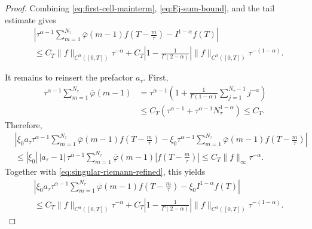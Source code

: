 \documentclass[letterpaper]{article}
\numberwithin{equation}{section}
\theoremstyle{definition}
\theoremstyle{remark}
\begin{document}
\begin{proof}
Combining \eqref{eq:first-cell-mainterm}, \eqref{eq:Ej-sum-bound}, and the tail estimate gives
\begin{equation}\label{eq:singular-riemann-refined}
\begin{aligned}
  &\left|
    \tau^{\alpha-1}\sum_{m=1}^{N_\tau}\overline\varphi(m-1)
    f\!\left(T-\frac{m}{\tau}\right)
    -
    I^{1-\alpha}f(T)
  \right|
  \\
  &\le
  C_T\|f\|_{C^{\alpha}([0,T])}\tau^{-\alpha}
  +
  C_T\left|1-\frac{1}{\Gamma(2-\alpha)}\right|
  \|f\|_{C^{\alpha}([0,T])}\tau^{-(1-\alpha)}.
\end{aligned}
\end{equation}

It remains to reinsert the prefactor $a_\tau$. First,
\begin{align*}
\tau^{\alpha-1}\sum_{m=1}^{N_\tau}\overline\varphi(m-1)
&=
\tau^{\alpha-1}\left(
1+\frac{1}{\Gamma(1-\alpha)}\sum_{j=1}^{N_\tau-1}j^{-\alpha}
\right)
\\
&\le
C_T\left(\tau^{\alpha-1}+\tau^{\alpha-1}N_\tau^{1-\alpha}\right)
\le C_T.
\end{align*}
Therefore,
\begin{align*}
  &\left|
    \xi_0 a_\tau\tau^{\alpha-1}
    \sum_{m=1}^{N_\tau}\overline\varphi(m-1)
    f\!\left(T-\frac{m}{\tau}\right)
    -
    \xi_0\tau^{\alpha-1}
    \sum_{m=1}^{N_\tau}\overline\varphi(m-1)
    f\!\left(T-\frac{m}{\tau}\right)
  \right|
  \\
  &\le
  |\xi_0|\,|a_\tau-1|\,\tau^{\alpha-1}
  \sum_{m=1}^{N_\tau}\overline\varphi(m-1)
  \left|f\!\left(T-\frac{m}{\tau}\right)\right|
\le  C_T\|f\|_{\infty}\tau^{-\alpha}.
\end{align*}
Together with \eqref{eq:singular-riemann-refined}, this yields
\begin{equation}\label{eq:singular-riemann-final}
\begin{aligned}
  &\left|
    \xi_0 a_\tau\tau^{\alpha-1}
    \sum_{m=1}^{N_\tau}\overline\varphi(m-1)
    f\!\left(T-\frac{m}{\tau}\right)
    -
    \xi_0 I^{1-\alpha}f(T)
  \right|
  \\
  &\le
  C_T\|f\|_{C^{\alpha}([0,T])}\tau^{-\alpha}
  +
  C_T\left|1-\frac{1}{\Gamma(2-\alpha)}\right|
  \|f\|_{C^{\alpha}([0,T])}\tau^{-(1-\alpha)}.
\end{aligned}
\end{equation}


\end{proof}
\end{document}
